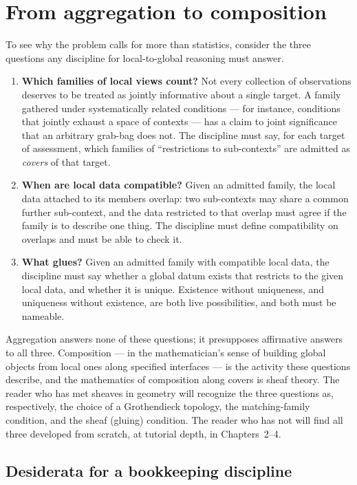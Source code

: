 \section{From aggregation to composition}\label{ch01:sec:composition}

To see why the problem calls for more than statistics, consider the three
questions any discipline for local-to-global reasoning must answer.

\begin{enumerate}
\item \textbf{Which families of local views count?} Not every collection of
observations deserves to be treated as jointly informative about a single
target. A family gathered under systematically related conditions --- for
instance, conditions that jointly exhaust a space of contexts --- has a
claim to joint significance that an arbitrary grab-bag does not. The
discipline must say, for each target of assessment, which families of
``restrictions to sub-contexts'' are admitted as \emph{covers} of that
target.
\item \textbf{When are local data compatible?} Given an admitted family, the
local data attached to its members overlap: two sub-contexts may share a
common further sub-context, and the data restricted to that overlap must
agree if the family is to describe one thing. The discipline must define
compatibility on overlaps and must be able to check it.
\item \textbf{What glues?} Given an admitted family with compatible local
data, the discipline must say whether a global datum exists that restricts
to the given local data, and whether it is unique. Existence without
uniqueness, and uniqueness without existence, are both live possibilities,
and both must be nameable.
\end{enumerate}

Aggregation answers none of these questions; it presupposes affirmative
answers to all three. Composition --- in the mathematician's sense of
building global objects from local ones along specified interfaces --- is
the activity these questions describe, and the mathematics of composition
along covers is sheaf theory. The reader who has met sheaves in geometry
will recognize the three questions as, respectively, the choice of a
Grothendieck topology, the matching-family condition, and the sheaf (gluing)
condition. The reader who has not will find all three developed from
scratch, at tutorial depth, in Chapters~2--4.

\subsection{Desiderata for a bookkeeping discipline}\label{ch01:sec:desiderata}

